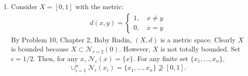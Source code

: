 \documentclass{article}
\begin{document}
\begin{enumerate}
	\item 
%	
	Consider $X = [0,1]$ with the metric:
	\begin{align*}
	d(x,y) = \begin{cases}
	1, \quad x\neq y\\
	0, \quad x = y
	\end{cases}
	\end{align*}
	By Problem 10, Chapter 2, Baby Rudin, $(X,d)$ is a metric space. Clearly $X$ is bounded because $X \subset \mathcal{N}_{r=2}(0)$. However, $X$ is not totally bounded. Set $\epsilon = 1/2$. Then, for any $x$, $\mathcal{N}_\epsilon(x) = \{x\}$. For any finite set $\{x_1,\dots,x_n\}$,
	\begin{align*}
	\cup^n_{i=1}\mathcal{N}_\epsilon(x_i) = \{ x_1,\dots,x_n\} \not\supseteq [0,1].
	\end{align*}


\end{enumerate}
\end{document}
